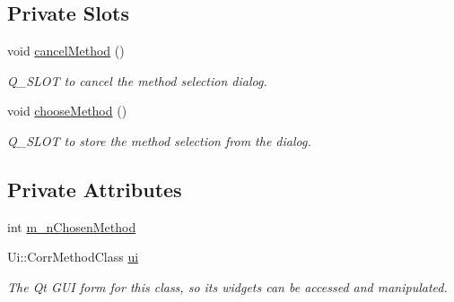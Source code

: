 \subsection*{Private Slots}
\begin{CompactItemize}
\item 
\hypertarget{classCorrMethod_87e628d7ef6facc9a402880d7e01ea36}{
void \hyperlink{classCorrMethod_87e628d7ef6facc9a402880d7e01ea36}{cancelMethod} ()}
\label{classCorrMethod_87e628d7ef6facc9a402880d7e01ea36}

\begin{CompactList}\small\item\em Q\_\-SLOT to cancel the method selection dialog. \item\end{CompactList}\item 
\hypertarget{classCorrMethod_7522197ac15c7563aee8d15d0cff3d95}{
void \hyperlink{classCorrMethod_7522197ac15c7563aee8d15d0cff3d95}{chooseMethod} ()}
\label{classCorrMethod_7522197ac15c7563aee8d15d0cff3d95}

\begin{CompactList}\small\item\em Q\_\-SLOT to store the method selection from the dialog. \item\end{CompactList}\end{CompactItemize}
\subsection*{Private Attributes}
\begin{CompactItemize}
\item 
int \hyperlink{classCorrMethod_3e64e1a2c9eabff57b7e58eaff13f45f}{m\_\-nChosenMethod}
\item 
\hypertarget{classCorrMethod_866bb1b72235d777ca96a6ce9701f9f6}{
Ui::CorrMethodClass \hyperlink{classCorrMethod_866bb1b72235d777ca96a6ce9701f9f6}{ui}}
\label{classCorrMethod_866bb1b72235d777ca96a6ce9701f9f6}

\begin{CompactList}\small\item\em The Qt GUI form for this class, so its widgets can be accessed and manipulated. \item\end{CompactList}\end{CompactItemize}


